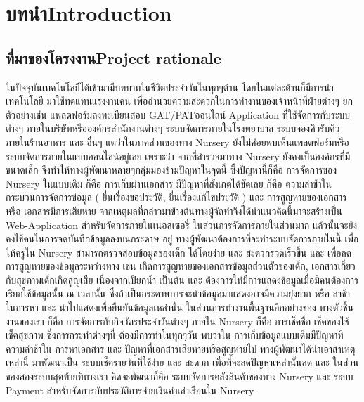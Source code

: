 \chapter{\ifcpe บทนำ\else Introduction\fi}

\section{\ifcpe ที่มาของโครงงาน\else Project rationale\fi}

ในปัจจุบันเทคโนโลยีได้เข้ามามีบทบาทในชีวิตประจําวันในทุกๆด้าน โดยในแต่ละด้านก็มีการนําเทคโนโลยี มาใช้ทดแทนแรงงานคน  เพื่ออํานวยความสะดวกในการทํางานของเจ้าหน้าที่ฝ่ายต่างๆ  ยกตัวอย่างเช่น แพลตฟอร์มลงทะเบียนสอบ GAT/PATออนไลน์ Application ที่ใช้จัดการกับระบบต่างๆ ภายในบริษัทหรือองค์กรสำนักงานต่างๆ ระบบจัดการภายในโรงพยาบาล ระบบจองคิวรับคิวภายในร้านอาหาร และ อื่นๆ
แต่ว่าในภาคส่วนของทาง Nursery ยังไม่ค่อยพบเห็นแพลตฟอร์มหรือระบบจัดการภายในแบบออนไลน์อยู่เลย
เพราะว่า จากที่สำรวจมาทาง Nursery ยังคงเป็นองค์กรที่มีขนาดเล็ก จึงทำให้ทางผู้พัฒนาหลายๆกลุ่มมองข้ามปัญหาในจุดนี้  ซึ่งปัญหานี้ก็คือ การจัดการของ Nursery ในแบบเดิม ก็คือ การเก็บผ่านเอกสาร  มีปัญหาที่สังเกตได้ชัดเลย ก็คือ ความล่าช้าในกระบวนการจัดการข้อมูล ( ยื่นเรื่องขอประวัติ, ยื่นเรื่องแก้ไขประวัติ ) และ การสูญหายของเอกสาร หรือ เอกสารมีการเสียหาย  
จากเหตุผลที่กล่าวมาข้างต้นทางผู้จัดทําจึงได้นำแนวคิดนี้มาจะสร้างเป็น Web-Application 
สําหรับจัดการภายในเนอสเซอรี่ ในส่วนการจัดการภายในส่วนมาก แล้วนั้นจะยังคงใช้คนในการจดบันทึกข้อมูลลงบนกระดาษ
อยู่ ทางผู้พัฒนาต้องการที่จะทําระบบจัดการภายในนี้ เพื่อให้ครูใน Nursery สามารถตรวจสอบข้อมูลของเด็ก ได้โดยง่าย และ สะดวกรวดเร็วขึ้น และ  เพื่อลดการสูญหายของข้อมูลระหว่างทาง เช่น เกิดการสูญหายของเอกสารข้อมูลส่วนตัวของเด็ก, เอกสารเกี่ยวกับสุขภาพเด็กเกิดสูญเสีย เนื่องจากเปียกน้ำ เป็นต้น และ ต้องการให้มีการแสดงข้อมูลเมื่อมีคนต้องการเรียกใช้ข้อมูลนั้น ณ เวลานั้น   ซึ่งถ้าเป็นกระดาษการจะนําข้อมูลมาแสดงอาจมีความยุ่งยาก หรือ ล่าช้าในการหา และ นําไปแสดงเพื่อยืนยันข้อมูลเหล่านั้น ในส่วนการทำงานพื้นฐานอีกอย่างของ ทางตัวชิ้นงานของเรา 
ก็คือ การจัดการกับกิจวัตรประจำวันต่างๆ ภายใน Nursery ก็คือ การเช็คชื่อ เช็คของใช้ เช็คสุขภาพ
ซึ่งการกระทำต่างๆนี้ ต้องมีการทำในทุกๆวัน พบว่าใน การเก็บข้อมูลแบบเดิมมีปัญหาที่ความล่าช้าใน การหาเอกสาร และ ปัญหาที่เอกสารเสียหายหรือสูญหายไป ทางผู้พัฒนาได้นำเอาสาเหตุเหล่านี้ มาพัฒนาเป็น ระบบเช็ครายวันที่ใช้ง่าย และ สะดวก เพื่อที่จะลดปัญหาเหล่านั้นลด และ ในส่วนของสองระบบสุดท้ายที่ทางเรา คิดจะพัฒนาก็คือ ระบบจัดการคลังสินค้าของทาง Nursery และ ระบบ Payment สำหรับจัดการกับประวัติการจ่ายเงินค่าเล่าเรียนใน Nursery



